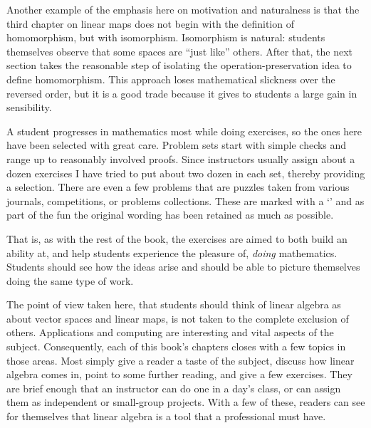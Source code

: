 Another example of the emphasis here on motivation and naturalness
is that the third chapter on linear maps
does not begin with the definition of homomorphism, 
but with isomorphism.
Isomorphism is natural: students themselves
observe that some spaces are ``just like'' others.
After that,
the next section takes the reasonable step of 
isolating the operation-preservation idea
to define homomorphism.
This approach loses mathematical slickness over the reversed order, 
but it is a good trade because it gives to students
a large gain in sensibility.


A student progresses in mathematics most while doing exercises, so the ones
here have been selected with great care.
Problem sets start with 
simple checks and range up to reasonably involved proofs.
Since instructors usually assign about a dozen exercises
I have tried to put about two dozen in each set, 
thereby providing a selection.
There are even a few problems that are puzzles
taken from various journals, competitions, or
problems collections. 
These are marked with a
`\puzzlemark' and 
as part of the fun the original wording
has been retained as much as possible.

That is, as with the rest of the book, 
the exercises are aimed to both build an ability at,
and help students experience the pleasure of, 
\emph{doing} mathematics.
Students should see how the ideas arise and should be able to 
picture themselves doing the same type of work.


\medskip
{}
The point of view taken here, that students should think of 
linear algebra as about vector spaces
and linear maps, is not taken to the complete exclusion of others.
Applications and computing are interesting and vital aspects 
of the subject.
Consequently, each of this book's chapters closes with a few 
topics in those areas.
Most simply give a reader
a taste of the subject, discuss how linear algebra comes in,
point to some further reading, and give a few exercises. 
They are brief enough that an instructor can do one
in a day's class, 
or can assign them as independent or small-group projects.
With a few of these, 
readers can see for themselves that linear algebra is a tool
that a professional must have. 




